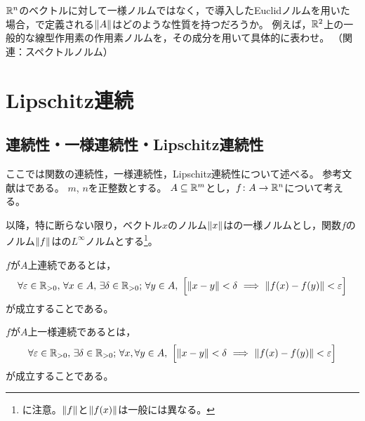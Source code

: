 \documentclass[b5paper,draft]{ltjsbook}
\begin{document}
\begin{prob}
    $\mathbb{R}^n$のベクトルに対して一様ノルムではなく，で導入したEuclidノルムを用いた場合，で定義される$\norm{A}$はどのような性質を持つだろうか。
    例えば，$\mathbb{R}^2$上の一般的な線型作用素の作用素ノルムを，その成分を用いて具体的に表わせ。
    （関連：スペクトルノルム）
\end{prob}


\section{Lipschitz連続}

\subsection{連続性・一様連続性・Lipschitz連続性}
ここでは関数の連続性，一様連続性，Lipschitz連続性について述べる。
参考文献は\cite{sugiura}である。
$m$, $n$を正整数とする。
$A\subseteq \mathbb{R}^m$とし，$f\colon A\to \mathbb{R}^n$について考える。

以降，特に断らない限り，ベクトル$x$のノルム$\norm{x}$はの一様ノルムとし，関数$f$のノルム$\norm{f}$はの$L^\infty$ノルムとする\footnote{に注意。$\norm{f}$と$\norm{\fun{f}{x}}$は一般には異なる。}。

\begin{defi}[連続性]
    $f$が$A$上連続であるとは，
    \begin{equation}
        \forall \varepsilon\in\Rposi,\, \forall x\in A,\, \exists \delta \in \Rposi;\, \forall y \in A,\ \bsqu{
            \norm{x-y}<\delta \ \Longrightarrow\ \norm{\fun{f}{x}-\fun{f}{y}}<\varepsilon
        }
    \end{equation}
    が成立することである。
\end{defi}

\begin{defi}[一様連続性]
    $f$が$A$上一様連続であるとは，
    \begin{equation}
        \forall \varepsilon\in\Rposi,\, \exists \delta \in \Rposi;\,  \forall x, \forall y \in A,\ \bsqu{
            \norm{x-y}<\delta \ \Longrightarrow\ \norm{\fun{f}{x}-\fun{f}{y}}<\varepsilon
        }
    \end{equation}
    が成立することである。
\end{defi}
\end{document}
